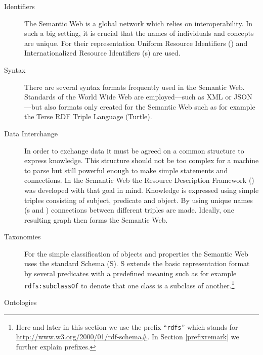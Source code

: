 \begin{description}
 \item[Identifiers] The Semantic Web is a global network which relies on interoperability. In such a big setting, it is crucial that the names of individuals and concepts are unique.
 For their representation Uniform Resource Identifiers (\uris) and Internationalized Resource Identifiers (\iri{}s) are used.  
 \item[Syntax] There are several syntax formats frequently used in the Semantic Web. Standards of the World Wide Web are employed---such as XML or JSON---but also formats 
 only created for the Semantic Web such as for example the Terse RDF Triple Language (Turtle). 
 \item[Data Interchange]
In order to exchange data it must be agreed on  a common structure to express knowledge. This 
structure should not be too complex for a machine to parse but still 
powerful enough to make simple statements and connections. 
In the Semantic Web the Resource Description Framework (\rdf) was developed with 
that goal in mind. Knowledge is expressed using simple triples consisting of subject,
predicate and object. By using unique names (\iri{}s and \uris) connections between different triples are made. 
Ideally, one resulting graph then forms the Semantic Web.
 \item[Taxonomies] For the simple classification of objects and properties the Semantic Web uses the standard \rdf Schema (\rdf{}S). \rdf{}S extends the basic representation format 
 \rdf by several predicates with a predefined meaning such as for example \texttt{rdfs:subclassOf} to denote that one class is a subclass of another.\footnote{
Here and later in this section we use the prefix 
``\texttt{rdfs}'' which stands for  \url{http://www.w3.org/2000/01/rdf-schema\#}.
In Section \ref{prefixremark} we further explain prefixes.
 } 
 \item[Ontologies]

\end{description}
